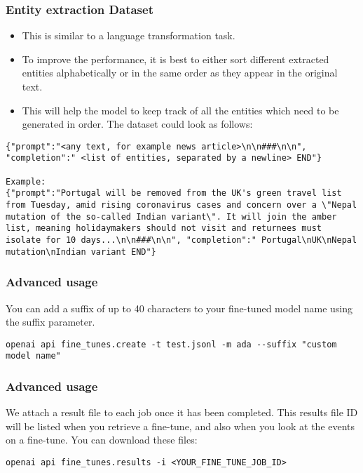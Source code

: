 \begin{frame}[fragile]\frametitle{Entity extraction Dataset}

\begin{itemize}
\item This is similar to a language transformation task. 
\item To improve the performance, it is best to either sort different extracted entities alphabetically or in the same order as they appear in the original text. 
\item This will help the model to keep track of all the entities which need to be generated in order. The dataset could look as follows:
\end{itemize}	 


\begin{lstlisting}
{"prompt":"<any text, for example news article>\n\n###\n\n", "completion":" <list of entities, separated by a newline> END"}

Example:
{"prompt":"Portugal will be removed from the UK's green travel list from Tuesday, amid rising coronavirus cases and concern over a \"Nepal mutation of the so-called Indian variant\". It will join the amber list, meaning holidaymakers should not visit and returnees must isolate for 10 days...\n\n###\n\n", "completion":" Portugal\nUK\nNepal mutation\nIndian variant END"}
\end{lstlisting}	
\end{frame}

\begin{frame}[fragile]\frametitle{Advanced usage}

You can add a suffix of up to 40 characters to your fine-tuned model name using the suffix parameter.



\begin{lstlisting}
openai api fine_tunes.create -t test.jsonl -m ada --suffix "custom model name"

\end{lstlisting}	
\end{frame}



\begin{frame}[fragile]\frametitle{Advanced usage}


We attach a result file to each job once it has been completed. This results file ID will be listed when you retrieve a fine-tune, and also when you look at the events on a fine-tune. You can download these files:


\begin{lstlisting}
openai api fine_tunes.results -i <YOUR_FINE_TUNE_JOB_ID>
\end{lstlisting}	
\end{frame}




